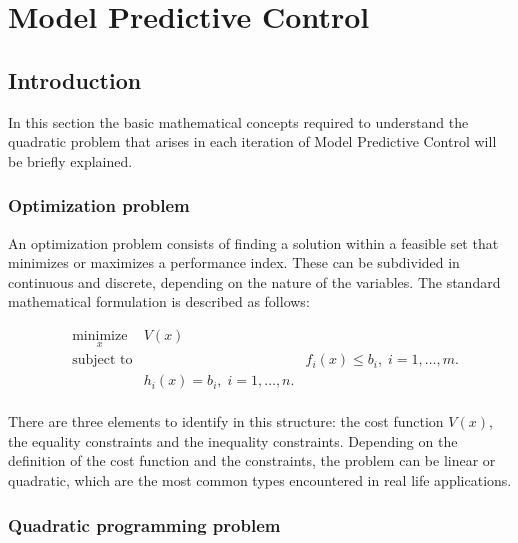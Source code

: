 \chapter{Model Predictive Control}
\label{chap:Model_Predictive_Control}

\section{Introduction}

In this section the basic mathematical concepts required to understand the quadratic problem that arises in each iteration of Model Predictive Control will be briefly explained.

\subsection{Optimization problem}%

An optimization problem consists of finding a solution within a feasible set that minimizes or maximizes a performance index. These can be subdivided in continuous and discrete, depending on the nature of the variables. The standard mathematical formulation is described as follows:

\begin{equation} \label{eq:gen_qp}
 \begin{aligned}
 & \underset{x}{\text{minimize}}
 & V(x) \\
 & \text{subject to}
 & & f_i(x) \leq b_i, \; 	i = 1, \ldots, m.\\
 & & h_i(x) = b_i, \; 	i = 1, \ldots, n.\\
 \end{aligned}
\end{equation}

There are three elements to identify in this structure: the cost function $V(x)$, the equality constraints and the inequality constraints. Depending on the definition of the cost function and the constraints, the problem can be linear or quadratic, which are the most common types encountered in real life applications. 

\subsection{Quadratic programming problem}%

